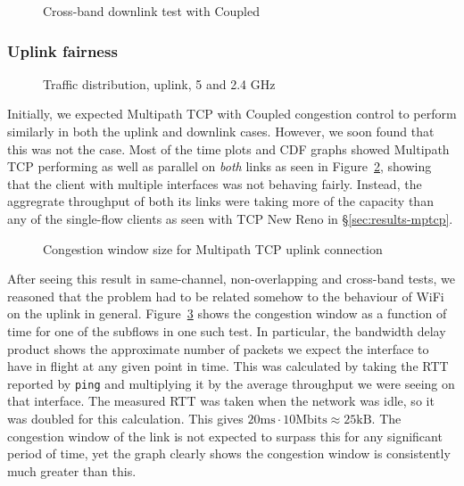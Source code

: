 \begin{figure}[h]
 \centering
 
 \caption{Cross-band downlink test with Coupled}\label{graph:cb-fairness-down}
\end{figure}

\subsubsection{Uplink fairness}

\begin{figure}[h]
 \centering
 
 \caption{Traffic distribution, uplink, 5 and 2.4 GHz}\label{graph:up-fair}
\end{figure}

Initially, we expected Multipath TCP with Coupled congestion control to perform
similarly in both the uplink and downlink cases. However, we soon found
that this was not the case. Most of the time plots and CDF graphs showed 
Multipath TCP performing as well as parallel on \emph{both} links as seen in
Figure~\ref{graph:up-fair}, showing that the client with multiple interfaces was
not behaving fairly. Instead, the aggregrate throughput of both its links were taking more of the capacity than any of the single-flow clients as seen with TCP New Reno in \S\ref{sec:results-mptcp}.

\begin{figure}[h]
 \centering
 
 \caption{Congestion window size for Multipath TCP uplink connection}\label{graph:fairness-up-close}
\end{figure}

After seeing this result in same-channel, non-overlapping and cross-band  
tests, we reasoned that the problem had to be related somehow to the 
behaviour of WiFi on the uplink in general. Figure~\ref{graph:fairness-up-close} 
shows the congestion window as a function of time for one of the subflows in one 
such test. In particular, the bandwidth delay product shows the approximate number of packets
we expect the interface to have in flight at any given point in time. This was
calculated by taking the RTT reported by \texttt{ping} and multiplying it by the
average throughput we were seeing on that interface. The measured RTT was taken
when the network was idle, so it was doubled for this calculation. This gives
$20\text{ms} \cdot 10\text{Mbits} \approx 25\text{kB}$. The congestion window of
the link is not expected to surpass this for any significant period of time, yet
the graph clearly shows the congestion window is consistently much greater than
this.

